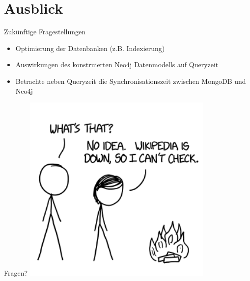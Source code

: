 \documentclass[12pt,usenames,dvipsnames]{beamer}
\begin{document}
	\section{Ausblick}
	\begin{frame}{Zukünftige Fragestellungen}
	\begin{itemize}[<+- | alert@+>]
	\item Optimierung der Datenbanken (z.B. Indexierung)
	\item Auswirkungen des konstruierten Neo4j Datenmodells auf Queryzeit
	\item Betrachte neben Queryzeit die Synchronisationszeit zwischen
	MongoDB und Neo4j
	\end{itemize}
	\end{frame}

\begin{frame}{Fragen?}
  \includegraphics[width=0.7\textwidth]{questions}
\end{frame}
\end{document}
